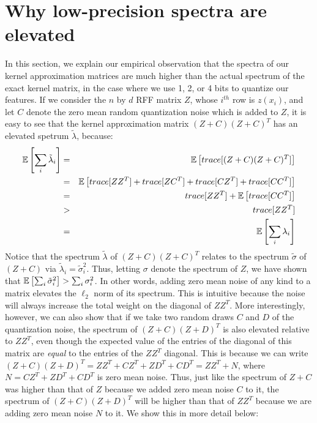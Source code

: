 \documentclass[12pt]{article}
\newcommand{\tsigma}{\tilde{\sigma}}
\newcommand{\tlambda}{\tilde{\lambda}}
\begin{document}
\section{Why low-precision spectra are elevated}
\label{sec:elevate_spectrum}
In this section, we explain our empirical observation that the spectra of our kernel approximation matrices are much higher than the actual spectrum of the exact kernel matrix, in the case where we use 1, 2, or 4 bits to quantize our features.  If we consider the $n$ by $d$ RFF matrix $Z$, whose $i^{th}$ row is $z(x_i)$, and let $C$ denote the zero mean random quantization noise which is added to $Z$, it is easy to see that the kernel approximation matrix $(Z+C)(Z+C)^T$ has an elevated spetrum $\tlambda$, because:
\begin{eqnarray*} 
\expect{}{\sum_i \tlambda_i} &=& \expect{}{trace[(Z+C)(Z+C)^T]} \\
&=& \expect{}{trace[ZZ^T] + trace[ZC^T] + trace[CZ^T] + trace[CC^T]}\\
&=& trace[ZZ^T] + \expect{}{trace[CC^T]} \\
&>& trace[ZZ^T] \\
&=& \expect{}{\sum_i \lambda_i}
\end{eqnarray*}
Notice that the spectrum $\tlambda$ of $(Z+C)(Z+C)^T$ relates to the spectrum $\tsigma$ of $(Z+C)$ via $\tlambda_i = \tsigma_i^2$.  Thus, letting $\sigma$ denote the spectrum of $Z$, we have shown that
$\expect{}{\sum_i \tsigma_i^2} > \sum_i \sigma_i^2$.  In other words, adding zero mean noise of any kind to a matrix elevates the $\ell_2$ norm of its spectrum.  This is intuitive because the noise will always increase the total weight on the diagonal of $ZZ^T$.
More interestingly, however, we can also show that if we take two random draws $C$ and $D$ of the quantization noise, the spectrum of $(Z+C)(Z+D)^T$ is also elevated relative to $ZZ^T$, even though the expected value of the entries of the diagonal of this matrix are \textit{equal} to the entries of the $ZZ^T$ diagonal.  This is because we can write $(Z+C)(Z+D)^T = ZZ^T + CZ^T + ZD^T + CD^T = ZZ^T + N$, where $N = CZ^T + ZD^T + CD^T$ is zero mean noise.  Thus, just like the spectrum of $Z+C$ was higher than that of $Z$ because we added zero mean noise $C$ to it, the spectrum of $(Z+C)(Z+D)^T$ will be higher than that of $ZZ^T$ because we are adding zero mean noise $N$ to it.  We show this in more detail below:
\end{document}
